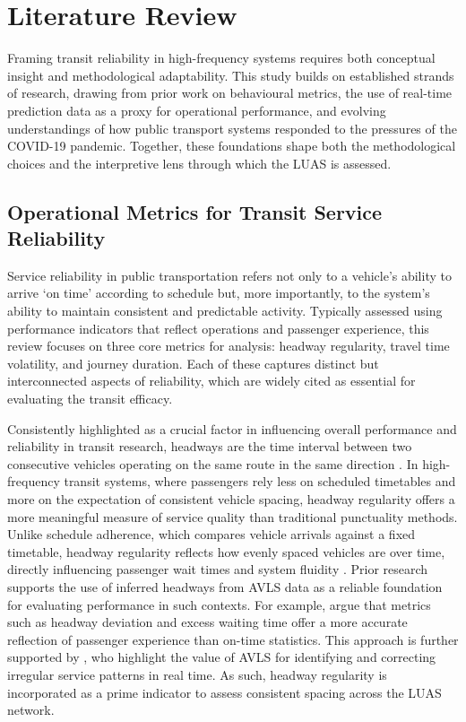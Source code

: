 \section*{Literature Review}

    Framing transit reliability in high-frequency systems requires both conceptual insight and methodological adaptability. This study builds on established strands of research, drawing from prior work on behavioural metrics, the use of real-time prediction data as a proxy for operational performance, and evolving understandings of how public transport systems responded to the pressures of the COVID-19 pandemic. Together, these foundations shape both the methodological choices and the interpretive lens through which the LUAS is assessed.

\subsection*{Operational Metrics for Transit Service Reliability}

    Service reliability in public transportation refers not only to a vehicle’s ability to arrive ‘on time’ according to schedule but, more importantly, to the system’s ability to maintain consistent and predictable activity. Typically assessed using performance indicators that reflect operations and passenger experience,  this review focuses on three core metrics for analysis: headway regularity, travel time volatility, and journey duration. Each of these captures distinct but interconnected aspects of reliability, which are widely cited as essential for evaluating the transit efficacy.

    Consistently highlighted as a crucial factor in influencing overall performance and reliability in transit research, headways are the time interval between two consecutive vehicles operating on the same route in the same direction \parencite{abkowitz1978transit}. In high-frequency transit systems, where passengers rely less on scheduled timetables and more on the expectation of consistent vehicle spacing, headway regularity offers a more meaningful measure of service quality than traditional punctuality methods. Unlike schedule adherence, which compares vehicle arrivals against a fixed timetable, headway regularity reflects how evenly spaced vehicles are over time, directly influencing passenger wait times and system fluidity \parencite{albright2012transit}.  Prior research supports the use of inferred headways from AVLS data as a reliable foundation for evaluating performance in such contexts. For example, \textcite{furth2007optimal} argue that metrics such as headway deviation and excess waiting time offer a more accurate reflection of passenger experience than on-time statistics. This approach is further supported by \textcite{ma2014measuring}, who highlight the value of AVLS for identifying and correcting irregular service patterns in real time. As such, headway regularity is incorporated as a prime indicator to assess consistent spacing across the LUAS network.

